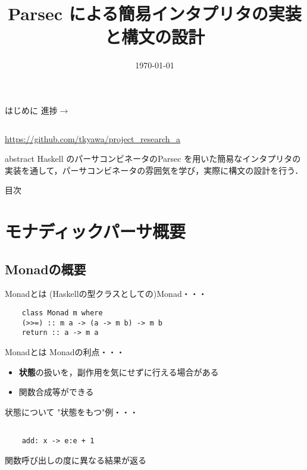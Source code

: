 \documentclass[uplatex,dvipdfmx,ja=standard]{beamer}
\begin{document}
%
%
\title[Midterm Presentation]{Parsec による簡易インタプリタの実装と構文の設計} 
\date{\today}

\begin{frame}
\titlepage 
\end{frame}

\begin{frame}[fragile]{はじめに}
    \large 進捗$\to$
    \begin{verbatim}
    \end{verbatim}
    \url{https://github.com/tkyawa/project_research_a}
\end{frame}

\begin{frame}{abstract}
    Haskell のパーサコンビネータのParsec を用いた簡易なインタプリタの実装を通して，パーサコンビネータの雰囲気を学び，実際に構文の設計を行う．
\end{frame}

\begin{frame}{目次}
    \tableofcontents
\end{frame}

\section{モナディックパーサ概要}
\subsection{Monadの概要}
\begin{frame}[fragile]{Monadとは}
    (Haskellの型クラスとしての)Monad・・・
    \begin{verbatim}
    class Monad m where 
    (>>=) :: m a -> (a -> m b) -> m b 
    return :: a -> m a
    \end{verbatim}
\end{frame}

\begin{frame}{Monadとは}
    Monadの利点・・・
    \begin{itemize}
        \item \textbf{状態}の扱いを，副作用を気にせずに行える場合がある
        \item 関数合成等ができる
    \end{itemize}
\end{frame}

\begin{frame}[fragile]{状態について}
    "状態をもつ"例・・・
    \begin{verbatim}
    
    add: x -> e:e + 1

    \end{verbatim}

    関数呼び出しの度に異なる結果が返る
\end{frame}
\end{document}
